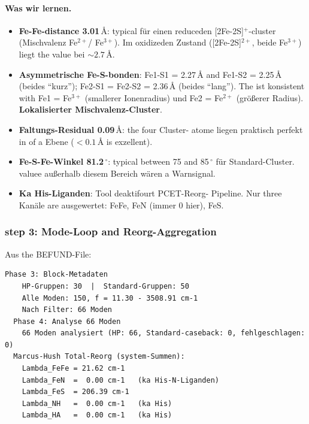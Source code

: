 \documentclass[11pt,a4paper,twoside]{article}
\providecommand{\angstrom}{\text{\AA}}    %
\theoremstyle{remark}
\begin{document}
\paragraph{Was wir lernen.}
\begin{itemize}\setlength{\itemsep}{0pt}
  \item \textbf{Fe-Fe-distance 3.01\,$\angstrom$}: typical f\"ur einen
        reduceden [2Fe-2S]$^{+}$-cluster (Mischvalenz Fe$^{2+}$/
        Fe$^{3+}$). Im oxidizeden Zustand
        ([2Fe-2S]$^{2+}$, beide Fe$^{3+}$) liegt the value bei
        $\sim 2.7$\,$\angstrom$.
  \item \textbf{Asymmetrische Fe-S-bonden}: Fe1-S1 = 2.27\,$\angstrom$
        and Fe1-S2 = 2.25\,$\angstrom$ (beides "`kurz"'); Fe2-S1 =
        Fe2-S2 = 2.36\,$\angstrom$ (beides "`lang"'). The ist
        konsistent with Fe1 = Fe$^{3+}$ (smallerer Ionenradius) und
        Fe2 = Fe$^{2+}$ (gr\"o{\ss}erer Radius). \textbf{Lokalisierter
        Mischvalenz-Cluster}.
  \item \textbf{Faltungs-Residual 0.09\,$\angstrom$}: the four Cluster-
        atome liegen praktisch perfekt in of a Ebene
        ($< 0.1\,\angstrom$ is exzellent).
  \item \textbf{Fe-S-Fe-Winkel 81.2\,$^{\circ}$}: typical between 75
        and 85\,$^{\circ}$ f\"ur Standard-Cluster. valuee au{\ss}erhalb
        diesem Bereich w\"aren a Warnsignal.
  \item \textbf{Ka His-Liganden}: Tool deaktifourt PCET-Reorg-
        Pipeline. Nur three Kan\"ale are ausgewertet: FeFe, FeN
        (immer 0 hier), FeS.
\end{itemize}

\subsubsection*{step 3: Mode-Loop and Reorg-Aggregation}

Aus the BEFUND-File:
\begin{lstlisting}[basicstyle=\ttfamily\small]
  Phase 3: Block-Metadaten
    HP-Gruppen: 30  |  Standard-Gruppen: 50
    Alle Moden: 150, f = 11.30 - 3508.91 cm-1
    Nach Filter: 66 Moden
  Phase 4: Analyse 66 Moden
    66 Moden analysiert (HP: 66, Standard-caseback: 0, fehlgeschlagen: 0)
  Marcus-Hush Total-Reorg (system-Summen):
    Lambda_FeFe = 21.62 cm-1
    Lambda_FeN  =  0.00 cm-1   (ka His-N-Liganden)
    Lambda_FeS  = 206.39 cm-1
    Lambda_NH   =  0.00 cm-1   (ka His)
    Lambda_HA   =  0.00 cm-1   (ka His)
\end{lstlisting}
\end{document}
